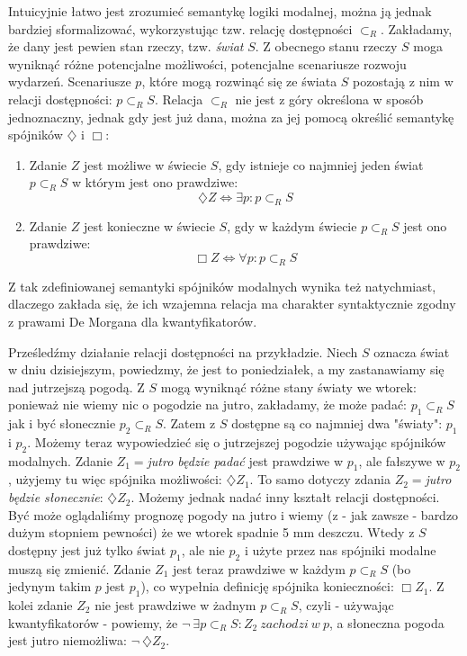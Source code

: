 \documentclass{article}
\begin{document}
Intuicyjnie łatwo jest zrozumieć semantykę logiki modalnej, można ją jednak bardziej sformalizować, wykorzystując tzw. relację dostępności $\subset_R$. Zakładamy, że dany jest pewien stan rzeczy, tzw. \emph{świat} $S$. Z obecnego stanu rzeczy $S$ moga wyniknąć różne potencjalne możliwości, potencjalne scenariusze rozwoju wydarzeń. Scenariusze $p$, które mogą rozwinąć się ze świata $S$ pozostają z nim w relacji dostępności: $p \subset_R S$. Relacja $\subset_R$ nie jest z góry określona w sposób jednoznaczny, jednak gdy jest już dana, można za jej pomocą określić semantykę spójników $\diamondsuit$ i $\Box$:
\begin{enumerate}
	\item Zdanie $Z$ jest możliwe w świecie $S$, gdy istnieje co najmniej jeden świat $p \subset_R S$ w którym jest ono prawdziwe:
	\begin{equation}
	\diamondsuit Z \Leftrightarrow \exists p: p \subset_R S
	\end{equation}
	\item Zdanie $Z$ jest konieczne w świecie $S$, gdy w każdym świecie $p \subset_R S$ jest ono prawdziwe:
	\begin{equation}
	\Box Z \Leftrightarrow \forall p: p \subset_R S
	\end{equation}
\end{enumerate}
Z tak zdefiniowanej semantyki spójników modalnych wynika też natychmiast, dlaczego zakłada się, że ich wzajemna relacja ma charakter syntaktycznie zgodny z prawami De Morgana dla kwantyfikatorów. 

Prześledźmy działanie relacji dostępności na przykładzie. Niech $S$ oznacza świat w dniu dzisiejszym, powiedzmy, że jest to poniedziałek, a my zastanawiamy się nad jutrzejszą pogodą. Z $S$ mogą wyniknąć różne stany światy we wtorek: ponieważ nie wiemy nic o pogodzie na jutro, zakładamy, że może padać: $p_1 \subset_R S$ jak i być słonecznie $p_2 \subset_R S$. Zatem z $S$ dostępne są co najmniej dwa "światy":  $p_1$ i  $p_2$. Możemy teraz wypowiedzieć się o jutrzejszej pogodzie używając spójników modalnych. Zdanie $Z_1 =$\emph{jutro będzie padać} jest prawdziwe w $p_1$, ale fałszywe w $p_2$, użyjemy tu więc spójnika możliwości: $\diamondsuit Z_1$. To samo dotyczy zdania $Z_2 =$\emph{jutro będzie słonecznie}: $\diamondsuit Z_2$. Możemy jednak nadać inny kształt relacji dostępności. Być może oglądaliśmy prognozę pogody na jutro i wiemy (z - jak zawsze - bardzo dużym stopniem pewności) że we wtorek spadnie 5 mm deszczu. Wtedy z $S$ dostępny jest już tylko świat $p_1$, ale nie $p_2$ i użyte przez nas spójniki modalne muszą się zmienić. Zdanie $Z_1$ jest teraz prawdziwe w każdym $p \subset_R S$ (bo jedynym takim $p$ jest $p_1$), co wypełnia definicję spójnika konieczności: $\Box Z_1$. Z kolei zdanie $Z_2$ nie jest prawdziwe w żadnym $p \subset_R S$, czyli - używając kwantyfikatorów - powiemy, że $\neg\ \exists p \subset_R S: Z_2\ zachodzi\ w\ p$, a słoneczna pogoda jest jutro niemożliwa: $ \neg\ \diamondsuit Z_2$. 
\end{document}
